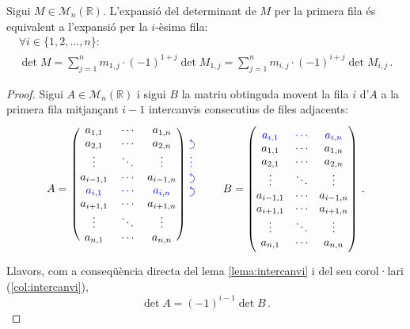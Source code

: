 \begin{lema}\label{lema:iesimafila}
	Sigui $M\in\mathcal{M}_n(\mathbb{R})$. L'expansió del determinant de $M$ per la primera fila és equivalent a l'expansió per la $i$-èsima fila:
	\begin{multline*}
	\forall i \in \{1,2,\ldots, n\}:\\
	\det M = \sum_{j=1}^{n} m_{1,j}\cdot(-1)^{1+j}\det M_{1,j} = \sum_{j=1}^{n} m_{i,j}\cdot(-1)^{i+j}\det M_{i,j}\,.
	\end{multline*}
	\begin{proof}
		Sigui $A\in\mathcal{M}_n(\mathbb{R})$ i sigui $B$ la matriu obtinguda movent la fila $i$ d'$A$ a la primera fila mitjançant $i-1$ intercanvis consecutius de files adjacents:
		\[
		A =\
		\begin{blockarray}{cccc}
		\begin{block}{(ccc)*{1}{>{\color{blue}}l<{}}}
		a_{1,1}&	\cdots&		a_{1,n}& 		\\
		a_{2,1}&	\cdots&		a_{2,n}& 		\ucarr\\
		\vdots&		\ddots&		\vdots& 		\vdots\\
		a_{i-1,1}&	\cdots&		a_{i-1,n}&    	\ucarr \\
		\bl a_{i,1}&\bl\cdots&	\bl a_{i,n}&    \ucarr \\
		a_{i+1,1}&	\cdots&		a_{i+1,n}&    	\\
		\vdots&		\ddots&		\vdots& 		\\
		a_{n,1}&	\cdots&		a_{n,n}& 		\\	
		\end{block}
		\end{blockarray}
		\qquad
		B =
		\begin{pmatrix}
		\bl a_{i,1}&\bl\cdots&	\bl a_{i,n}\\
		a_{1,1}&	\cdots&		a_{1,n}\\
		a_{2,1}&	\cdots&		a_{2,n}\\
		\vdots&		\ddots&		\vdots\\
		a_{i-1,1}&	\cdots&		a_{i-1,n}\\
		a_{i+1,1}&	\cdots&		a_{i+1,n}\\
		\vdots&		\ddots&		\vdots\\
		a_{n,1}&	\cdots&		a_{n,n}\\
		\end{pmatrix}\,.
		\]
		Llavors, com a conseqüència directa del lema \ref{lema:intercanvi} i del seu corol·lari (\ref{col:intercanvi}), 
		\begin{equation}\label{eq:detrel}
		\det A = (-1)^{i-1}\det B\,.
		\end{equation}
		

\end{proof}
\end{lema}

